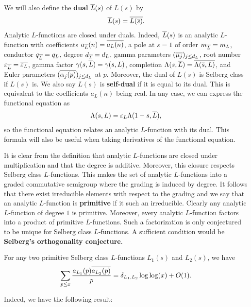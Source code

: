     We will also define the \textbf{dual} \(\overline{L}(s)\) of \(L(s)\) by
    \[
      \overline{L}(s) = \overline{L(\overline{s})}.
    \]
    Analytic \(L\)-functions are closed under duals. Indeed, \(\overline{L}(s)\) is an analytic \(L\)-function with coefficients \(a_{\overline{L}}(n) = \overline{a_{L}(n)}\), a pole at \(s = 1\) of order \(m_{\overline{L}} = m_{L}\), conductor \(q_{\overline{L}} = q_{L}\), degree \(d_{\overline{L}} = d_{L}\), gamma parameters \((\overline{\mu_{j}})_{j \le d_{L}}\), root number \(\varepsilon_{\overline{L}} = \overline{\varepsilon_{L}}\), gamma factor \(\gamma(s,\overline{L}) = \gamma(s,L)\), completion \(\Lambda(s,\overline{L}) = \overline{\Lambda(\overline{s},L)}\), and Euler parameters \((\overline{\alpha_{j}(p)})_{j \le d_{L}}\) at \(p\). Moreover, the dual of \(L(s)\) is Selberg class if \(L(s)\) is. We also say \(L(s)\) is \textbf{self-dual} if it is equal to its dual. This is equivalent to the coefficients \(a_{L}(n)\) being real. In any case, we can express the functional equation as
    \[
      \Lambda(s,L) = \varepsilon_{L}\Lambda(1-s,\overline{L}),
    \]
    so the functional equation relates an analytic \(L\)-function with its dual. This formula will also be useful when taking derivatives of the functional equation.

    It is clear from the definition that analytic \(L\)-functions are closed under multiplication and that the degree is additive. Moreover, this closure respects Selberg class \(L\)-functions. This makes the set of analytic \(L\)-functions into a graded commutative semigroup where the grading is induced by degree. It follows that there exist irreducible elements with respect to the grading and we say that an analytic \(L\)-function is \textbf{primitive} if it such an irreducible. Clearly any analytic \(L\)-function of degree \(1\) is primitive. Moreover, every analytic \(L\)-function factors into a product of primitive \(L\)-functions. Such a factorization is only conjectured to be unique for Selberg class \(L\)-functions. A sufficient condition would be \textbf{Selberg's orthogonality conjecture}.

    \begin{conjecture*}
      For any two primitive Selberg class \(L\)-functions \(L_{1}(s)\) and \(L_{2}(s)\), we have
      \[
        \sum_{p \le x}\frac{a_{L_{1}}(p)\overline{a_{L_{2}}(p)}}{p} = \delta_{L_{1},L_{2}}\log\log(x)+O(1).
      \]
    \end{conjecture*}

    Indeed, we have the following result:

